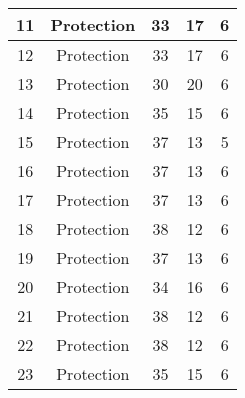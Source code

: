 \documentclass[results.tex]{subfiles}
\begin{document}
\begin{center}
\begin{tabular}{| c || c | c | c | c |}
            \hline
            11                      & Protection                   & 33                     & 17                      & 6                    \\
            \hline
            12                      & Protection                   & 33                     & 17                      & 6                    \\
            \hline
            13                      & Protection                   & 30                     & 20                      & 6                    \\
            \hline
            14                      & Protection                   & 35                     & 15                      & 6                    \\
            \hline
            15                      & Protection                   & 37                     & 13                      & 5                    \\
            \hline
            16                      & Protection                   & 37                     & 13                      & 6                    \\
            \hline
            17                      & Protection                   & 37                     & 13                      & 6                    \\
            \hline
            18                      & Protection                   & 38                     & 12                      & 6                    \\
            \hline
            19                      & Protection                   & 37                     & 13                      & 6                    \\
            \hline
            20                      & Protection                   & 34                     & 16                      & 6                    \\
            \hline
            21                      & Protection                   & 38                     & 12                      & 6                    \\
            \hline
            22                      & Protection                   & 38                     & 12                      & 6                    \\
            \hline
            23                      & Protection                   & 35                     & 15                      & 6                    \\

\end{tabular}
\end{center}
\end{document}
